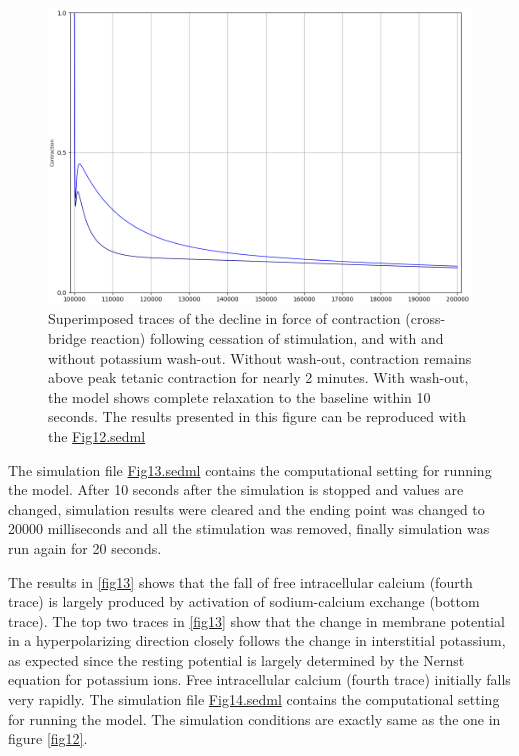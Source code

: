 \documentclass[fleqn,10pt]{physiome}
\begin{document}
\begin{figure}[h!]
\centering
\includegraphics[width=0.8\linewidth]{figure11}
\caption{Superimposed traces of the decline in force of contraction (cross-bridge reaction) following cessation of stimulation, and with and without potassium wash-out. Without wash-out, contraction remains above peak tetanic contraction for nearly 2 minutes. With wash-out, the model shows complete relaxation to the baseline within 10 seconds. The results presented in this figure can be reproduced with the \href{https://models.physiomeproject.org/workspace/5f4/file/26289d9227fbf4f66ca8106d8bf80ff9a51a5ac6/Fig12.sedml}{Fig12.sedml}}
\label{fig11}
\end{figure}



The simulation file \href{http://models.cellml.org/workspace/5f4/file/4071d5b4ec40c5e2b845a7a75e942df1966d2ba2/Fig13.sedml}{Fig13.sedml} contains the computational setting for running the model. After 10 seconds after the simulation is stopped and values are changed, simulation results were cleared and the ending point was changed to 20000 milliseconds and all the stimulation was removed, finally simulation was run again for 20 seconds.\newline


The results in \autoref{fig13} shows that the fall of free intracellular calcium (fourth trace) is largely produced by activation of sodium-calcium exchange (bottom trace). The top two traces in \autoref{fig13} show that the change in membrane potential in a hyperpolarizing direction closely follows the change in interstitial potassium, as expected since the resting potential is largely determined by the Nernst equation for potassium ions. Free intracellular calcium (fourth trace) initially falls very rapidly. The simulation file \href{http://models.cellml.org/workspace/5f4/file/4071d5b4ec40c5e2b845a7a75e942df1966d2ba2/Fig14.sedml}{Fig14.sedml} contains the computational setting for running the model. The simulation conditions are exactly same as the one in figure \ref{fig12}.
\end{document}
